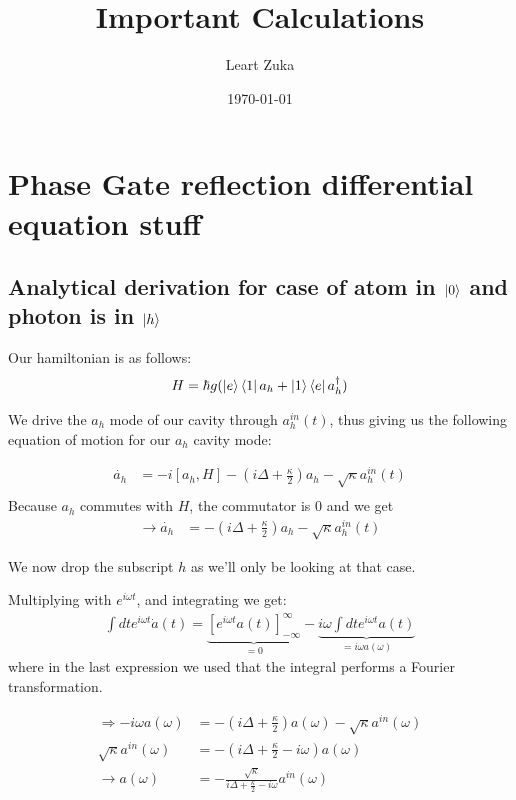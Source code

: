 \documentclass[a4paper]{article}
\title{Important Calculations}
\author{Leart Zuka}
\date{\today}
\begin{document}
\maketitle
\tableofcontents
\newpage


\section{Phase Gate reflection differential equation stuff}
\subsection{Analytical derivation for case of atom in $\ket{0}$ and photon is in $\ket{h}$}

Our hamiltonian is as follows:
\begin{align*}
    H = \hbar g(\ket{e}\bra{1}a_h + \ket{1}\bra{e}a_h^{\dagger})
\end{align*}

We drive the $a_h$ mode of our cavity through $a_h^{in}(t)$, thus giving us the following equation of motion for our $a_h$ cavity mode: 

\begin{align*}
    \dot{a_h} &=-i[a_h,H]-(i\Delta + \frac{\kappa}{2})a_h - \sqrt{\kappa}a_h^{in}(t) \\
\end{align*}
Because $a_h$ commutes with $H$, the commutator is 0 and we get
\begin{align*}
    \rightarrow \dot{a_h}&=-(i\Delta + \frac{\kappa}{2})a_h - \sqrt{\kappa}a_h^{in}(t)
\end{align*}

We now drop the subscript $h$ as we'll only be looking at that case.

Multiplying with $e^{i\omega t}$, and integrating we get:
\begin{align*}
    \int{dt e^{i\omega t}\dot{a}(t)} =  \underbrace{[e^{i\omega t}a(t)]_{-\infty}^{\infty}}_{=0} - \underbrace{i\omega\int{dt e^{i\omega t}a(t)}}_{=i\omega a(\omega)}
\end{align*}
where in the last expression we used that the integral performs a Fourier transformation.

\begin{align*}
    \Rightarrow -i\omega a(\omega) &= -(i\Delta + \frac{\kappa}{2})a(\omega) - \sqrt{\kappa}a^{in}(\omega) \\
    \sqrt{\kappa}a^{in}(\omega) &= -(i\Delta + \frac{\kappa}{2} - i\omega)a(\omega) \\
    \rightarrow a(\omega) &= -\frac{\sqrt{\kappa}}{i\Delta+\frac{\kappa}{2}-i\omega}a^{in}(\omega)
\end{align*}
\end{document}

